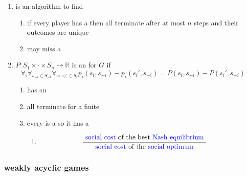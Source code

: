 \begin{enumerate}

  \item
    is an algorithm to find

    \begin{enumerate}
      \item
        if every player has a
        then all
        terminate after at most $n$ steps and their outcomes are unique
      \item
        may miss a
    \end{enumerate}
  \item
    $P: S_1\times \cdot \times S_n \rightarrow \mathbb{R}$ is an
    for $G$ if
    $$
    \forall_i \forall_{s_{-i} \in S_{-i}} \forall_{s_i, s_i' \in S_i}
    p_i(s_i, s_{-i}) -
    p_i(s_i', s_{-i}) =
    P(s_i, s_{-i}) -
    P(s_i', s_{-i})
    $$
    \begin{enumerate}
      \item
        has an

      \item
        all
        terminate for a finite

      \item
        every
        is a
        so it has a

        \begin{enumerate}
          \item
            $$
            \frac{\text{
              {\color{blue}{social cost}}
            of the best
            {\color{blue}{Nash equilibrium}}
            }}{{\text{
              {\color{blue}{social cost}}
            of the
            {\color{blue}{social optimum}}
            }}}
            $$
        \end{enumerate}
    \end{enumerate}

\end{enumerate}

\subsubsection{weakly acyclic games}

